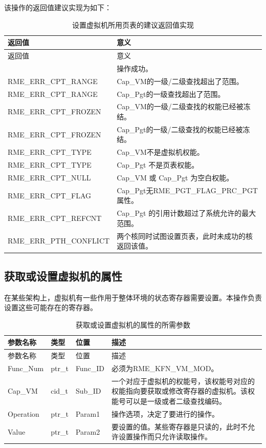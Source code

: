 该操作的返回值建议实现为如下：

\begin{xltabular}{\textwidth}{@{}>{\hsize\raggedright\arraybackslash}X>{\hsize\raggedright\arraybackslash}X@{}}
\caption{设置虚拟机所用页表的建议返回值实现}\label{tab:8-78-set-virtual-machine-page-table-suggested-return-values}\\
\toprule
返回值 & 意义\tabularnewline
\endfirsthead
\toprule
返回值 & 意义\tabularnewline
\midrule
\endhead
\bottomrule
{} & 操作成功。\tabularnewline
    RME\_ERR\_CPT\_RANGE & Cap\_VM的一级/二级查找超出了范围。\tabularnewline
    RME\_ERR\_CPT\_RANGE & Cap\_Pgt的一级查找超出了范围。\tabularnewline
    RME\_ERR\_CPT\_FROZEN & Cap\_VM的一级/二级查找的权能已经被冻结。\tabularnewline
    RME\_ERR\_CPT\_FROZEN & Cap\_Pgt的一级/二级查找的权能已经被冻结。\tabularnewline
    RME\_ERR\_CPT\_TYPE & Cap\_VM不是虚拟机权能。\tabularnewline
    RME\_ERR\_CPT\_TYPE & Cap\_Pgt 不是页表权能。\tabularnewline
    RME\_ERR\_CPT\_NULL & Cap\_VM 或 Cap\_Pgt 为空白权能。\tabularnewline
    RME\_ERR\_CPT\_FLAG & Cap\_Pgt无RME\_PGT\_FLAG\_PRC\_PGT属性。\tabularnewline
    RME\_ERR\_CPT\_REFCNT & Cap\_Pgt 的引用计数超过了系统允许的最大范围。\tabularnewline
    RME\_ERR\_PTH\_CONFLICT & 两个核同时试图设置页表，此时未成功的核返回该值。\tabularnewline
\end{xltabular}

\subsection{获取或设置虚拟机的属性}\label{subsec:8-get-or-set-virtual-machine-attributes}

在某些架构上，虚拟机有一些作用于整体环境的状态寄存器需要设置。本操作负责设置这些可能存在的寄存器。

\begin{xltabular}{\textwidth}{@{}>{\hsize\raggedright\arraybackslash}X>{\hsize\raggedright\arraybackslash}X>{\hsize\raggedright\arraybackslash}X>{\hsize\raggedright\arraybackslash}X@{}}
\caption{获取或设置虚拟机的属性的所需参数}\label{tab:8-79-get-or-set-virtual-machine-attributes-parameters}\\
\toprule
参数名称 & 类型 & 位置 & 描述\tabularnewline
\endfirsthead
\toprule
参数名称 & 类型 & 位置 & 描述\tabularnewline
\midrule
\endhead
\bottomrule
\endlastfoot
Func\_Num & ptr\_t & Func\_ID & 必须为RME\_KFN\_VM\_MOD。\tabularnewline
Cap\_VM & cid\_t & Sub\_ID &
一个对应于虚拟机的权能号，该权能号对应的权能指向要获取或修改寄存器的虚拟机。该权能号可以是一级或者二级查找编码。\tabularnewline
Operation & ptr\_t & Param1 &
操作选项，决定了要进行的操作。\tabularnewline
Value & ptr\_t & Param2 &
要设置的值。某些寄存器是只读的，此时不允许设置操作而只允许读取操作。\tabularnewline
\end{xltabular}

